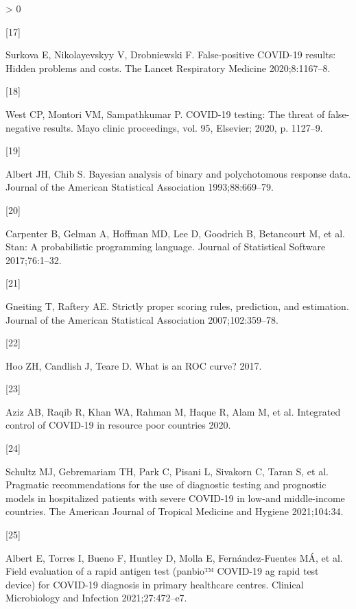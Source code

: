 \documentclass[]{elsarticle} %
\newlength{\cslhangindent}
\newlength{\csllabelwidth}
\newenvironment{CSLReferences}[2] %
 {%
  \setlength{\parindent}{0pt}
  \ifodd #1 \everypar{\setlength{\hangindent}{\cslhangindent}}\ignorespaces\fi
  \ifnum #2 > 0
  \setlength{\parskip}{#2\baselineskip}
  \fi
 }%
 {}
\newcommand{\CSLLeftMargin}[1]{\parbox[t]{\csllabelwidth}{#1}}
\newcommand{\CSLRightInline}[1]{\parbox[t]{\linewidth - \csllabelwidth}{#1}\break}
\begin{document}
\begin{CSLReferences}{0}{0}
\leavevmode\hypertarget{ref-surkova2020false}{}%
\CSLLeftMargin{{[}17{]} }
\CSLRightInline{Surkova E, Nikolayevskyy V, Drobniewski F. False-positive COVID-19 results: Hidden problems and costs. The Lancet Respiratory Medicine 2020;8:1167--8.}

\leavevmode\hypertarget{ref-west2020covid}{}%
\CSLLeftMargin{{[}18{]} }
\CSLRightInline{West CP, Montori VM, Sampathkumar P. COVID-19 testing: The threat of false-negative results. Mayo clinic proceedings, vol. 95, Elsevier; 2020, p. 1127--9.}

\leavevmode\hypertarget{ref-albert1993bayesian}{}%
\CSLLeftMargin{{[}19{]} }
\CSLRightInline{Albert JH, Chib S. Bayesian analysis of binary and polychotomous response data. Journal of the American Statistical Association 1993;88:669--79.}

\leavevmode\hypertarget{ref-carpenter2017stan}{}%
\CSLLeftMargin{{[}20{]} }
\CSLRightInline{Carpenter B, Gelman A, Hoffman MD, Lee D, Goodrich B, Betancourt M, et al. Stan: A probabilistic programming language. Journal of Statistical Software 2017;76:1--32.}

\leavevmode\hypertarget{ref-gneiting2007strictly}{}%
\CSLLeftMargin{{[}21{]} }
\CSLRightInline{Gneiting T, Raftery AE. Strictly proper scoring rules, prediction, and estimation. Journal of the American Statistical Association 2007;102:359--78.}

\leavevmode\hypertarget{ref-hoo2017roc}{}%
\CSLLeftMargin{{[}22{]} }
\CSLRightInline{Hoo ZH, Candlish J, Teare D. What is an ROC curve? 2017.}

\leavevmode\hypertarget{ref-aziz2020integrated}{}%
\CSLLeftMargin{{[}23{]} }
\CSLRightInline{Aziz AB, Raqib R, Khan WA, Rahman M, Haque R, Alam M, et al. Integrated control of COVID-19 in resource poor countries 2020.}

\leavevmode\hypertarget{ref-schultz2021pragmatic}{}%
\CSLLeftMargin{{[}24{]} }
\CSLRightInline{Schultz MJ, Gebremariam TH, Park C, Pisani L, Sivakorn C, Taran S, et al. Pragmatic recommendations for the use of diagnostic testing and prognostic models in hospitalized patients with severe COVID-19 in low-and middle-income countries. The American Journal of Tropical Medicine and Hygiene 2021;104:34.}

\leavevmode\hypertarget{ref-albert2021field}{}%
\CSLLeftMargin{{[}25{]} }
\CSLRightInline{Albert E, Torres I, Bueno F, Huntley D, Molla E, Fernández-Fuentes MÁ, et al. Field evaluation of a rapid antigen test (panbio™ COVID-19 ag rapid test device) for COVID-19 diagnosis in primary healthcare centres. Clinical Microbiology and Infection 2021;27:472--e7.}

\end{CSLReferences}
\end{document}
